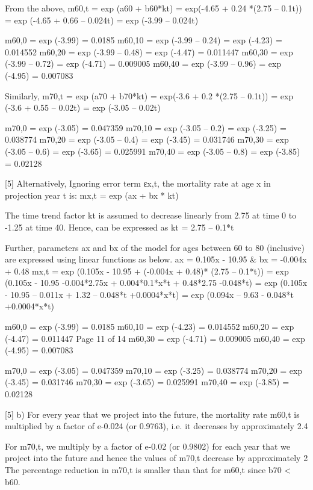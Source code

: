 From the above,
m60,t = exp (a60 + b60*kt)
= exp(-4.65 + 0.24 *(2.75 – 0.1t))
= exp (-4.65 + 0.66 – 0.024t)
= exp (-3.99 – 0.024t)

m60,0 = exp (-3.99) = 0.0185
m60,10 = exp (-3.99 – 0.24) = exp (-4.23) = 0.014552
m60,20 = exp (-3.99 – 0.48) = exp (-4.47) = 0.011447
m60,30 = exp (-3.99 – 0.72) = exp (-4.71) = 0.009005
m60,40 = exp (-3.99 – 0.96) = exp (-4.95) = 0.007083

Similarly,
m70,t = exp (a70 + b70*kt)
= exp(-3.6 + 0.2 *(2.75 – 0.1t))
= exp (-3.6 + 0.55 – 0.02t)
= exp (-3.05 – 0.02t)

m70,0 = exp (-3.05) = 0.047359
m70,10 = exp (-3.05 – 0.2) = exp (-3.25) = 0.038774
m70,20 = exp (-3.05 – 0.4) = exp (-3.45) = 0.031746
m70,30 = exp (-3.05 – 0.6) = exp (-3.65) = 0.025991
m70,40 = exp (-3.05 – 0.8) = exp (-3.85) = 0.02128

[5]
Alternatively,
Ignoring error term εx,t, the mortality rate at age x in projection year t is:
mx,t = exp (ax + bx * kt)

The time trend factor kt is assumed to decrease linearly from 2.75 at time 0 to -1.25 at time 40. Hence, can be expressed as
kt = 2.75 – 0.1*t

Further, parameters ax and bx of the model for ages between 60 to 80 (inclusive) are expressed using linear functions as below.
ax = 0.105x - 10.95 &
bx = -0.004x + 0.48
mx,t = exp (0.105x - 10.95 + (-0.004x + 0.48)* (2.75 – 0.1*t))
= exp (0.105x - 10.95 -0.004*2.75x + 0.004*0.1*x*t + 0.48*2.75 -0.048*t)
= exp (0.105x - 10.95 – 0.011x + 1.32 – 0.048*t +0.0004*x*t)
= exp (0.094x – 9.63 - 0.048*t +0.0004*x*t)

m60,0 = exp (-3.99) = 0.0185
m60,10 = exp (-4.23) = 0.014552
m60,20 = exp (-4.47) = 0.011447
Page 11 of 14
m60,30 = exp (-4.71) = 0.009005
m60,40 = exp (-4.95) = 0.007083

m70,0 = exp (-3.05) = 0.047359
m70,10 = exp (-3.25) = 0.038774
m70,20 = exp (-3.45) = 0.031746
m70,30 = exp (-3.65) = 0.025991
m70,40 = exp (-3.85) = 0.02128

[5]
b) For every year that we project into the future, the mortality rate m60,t is multiplied by a factor of e-0.024 (or 0.9763), i.e. it decreases by approximately 2.4%

For m70,t, we multiply by a factor of e-0.02 (or 0.9802) for each year that we project into the future and hence the values of m70,t decrease by approximately 2%
The percentage reduction in m70,t is smaller than that for m60,t since b70 < b60.


